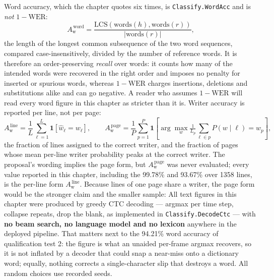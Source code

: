 Word accuracy, which the chapter quotes six times, is \texttt{Classify.WordAcc} and is \emph{not} $1-\mathrm{WER}$:
\begin{equation}
\label{eq:res-wacc}
A_{\mathrm{w}}^{\,\mathrm{word}}=\frac{\mathrm{LCS}(\mathrm{words}(h),\mathrm{words}(r))}{\lvert\mathrm{words}(r)\rvert},
\end{equation}
the length of the longest common subsequence of the two word sequences, compared case-insensitively, divided by the number of reference words.
It is therefore an order-preserving \emph{recall} over words: it counts how many of the intended words were recovered in the right order and imposes no penalty for inserted or spurious words, whereas $1-\mathrm{WER}$ charges insertions, deletions and substitutions alike and can go negative.
A reader who assumes $1-\mathrm{WER}$ will read every word figure in this chapter as stricter than it is.
Writer accuracy is reported per line, not per page:
\begin{equation}
\label{eq:res-wacc-writer}
A_{\mathrm{w}}^{\,\mathrm{line}}=\frac{1}{L}\sum_{\ell=1}^{L}\mathbf{1}\!\left[\hat w_\ell=w_\ell\right],\qquad
A_{\mathrm{w}}^{\,\mathrm{page}}=\frac{1}{P}\sum_{p=1}^{P}\mathbf{1}\!\left[\arg\max_w \tfrac{1}{L_p}\textstyle\sum_{\ell\in p}P(w\mid\ell)=w_p\right],
\end{equation}
the fraction of lines assigned to the correct writer, and the fraction of pages whose mean per-line writer probability peaks at the correct writer.
The proposal's wording implies the page form, but $A_{\mathrm{w}}^{\,\mathrm{page}}$ was never evaluated; every value reported in this chapter, including the 99.78\% and 93.67\% over 1358 lines, is the per-line form $A_{\mathrm{w}}^{\,\mathrm{line}}$.
Because lines of one page share a writer, the page form would be the stronger claim and the smaller sample: 
All text figures in this chapter were produced by greedy CTC decoding --- argmax per time step, collapse repeats, drop the blank, as implemented in \texttt{Classify.DecodeCtc} --- with \textbf{no beam search, no language model and no lexicon} anywhere in the deployed pipeline.
That matters next to the 94.21\% word accuracy of qualification test 2: the figure is what an unaided per-frame argmax recovers, so it is not inflated by a decoder that could snap a near-miss onto a dictionary word; equally, nothing corrects a single-character slip that destroys a word.
All random choices use recorded seeds.

